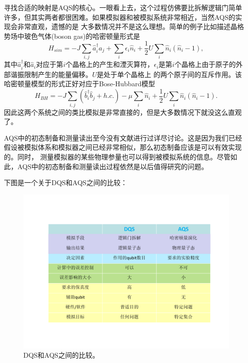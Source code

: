寻找合适的映射是AQS的核心。一眼看上去，这个过程仿佛要比拆解逻辑门简单许多，但其实两者都很困难。如果模拟器和被模拟系统非常相近，当然AQS的实现会非常直观，遗憾的是
大多数情况并不是这么理想。简单的例子比如描述晶格势场中玻色气体(boson gas)的哈密顿量形式是
 \begin{equation}\label{trotter}
 H_{sim} = -J\sum_{i,j}\hat{a}_i^{\dagger} \hat{a}_j+\sum_i\epsilon_i \hat{n}_i+\frac{1}{2}U\sum_i\hat{n}_i(\hat{n}_i-1),
\end{equation}
其中$\hat{a}_i^{\dagger}$和$\hat{a}_i$对应于第$i$个晶格上的产生和湮灭算符，$\epsilon_i$是第$i$个晶格上由于原子的外部谐振限制产生的能量偏移。$U$是处于单个晶格上
的两个原子间的互斥作用。该哈密顿量模型的形式正好对应于Bose-Hubbard模型
 \begin{equation}\label{trotter}
 H_{BH} = -J\sum_{i,j}(\hat{b}_i^{\dagger} \hat{b}_j+h.c.)-\mu\sum_i \hat{n}_i+\frac{1}{2}U\sum_i\hat{n}_i(\hat{n}_i-1).
\end{equation}
因此这两个系统之间的类比模拟是非常直接的，但是大多数情况下就没这么直观了。

AQS中的初态制备和测量读出至今没有文献进行过详尽讨论。这是因为我们已经假设被模拟体系和模拟器之间已经非常相似，那么初态制备应该是可以有效实现的。同时，
测量模拟器的某些物理参量也可以得到被模拟系统的信息。尽管如此，AQS中的初态制备和测量读出过程依然是以后值得研究的问题。

下图是一个关于DQS和AQS之间的比较：

        \begin{figure}[htbp]
            \begin{center}
              \includegraphics[width= 0.8\columnwidth]{figures/dqsaqs.pdf}
              \caption{DQS和AQS之间的比较。
              }
              \label{dqsaqs}
            \end{center}
        \end{figure}

